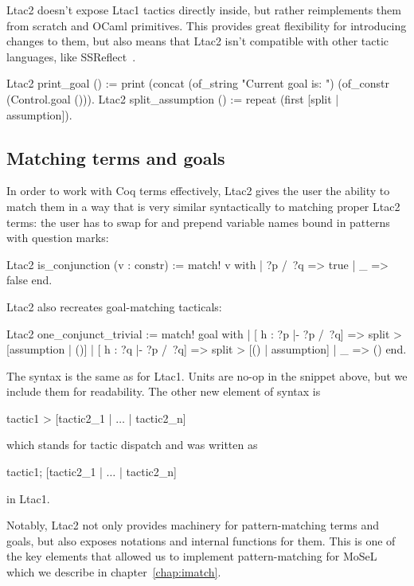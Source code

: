Ltac2 doesn't expose Ltac1 tactics directly inside, but rather reimplements them from scratch and OCaml primitives.
This provides great flexibility for introducing changes to them, but also means that Ltac2 isn't compatible with other tactic languages, like SSReflect~\cite[Section~3.1.3]{thecoqdevelopmentteamCoqProofAssistant2020}.

\begin{coq}
Ltac2 print_goal () := print (concat (of_string "Current goal is: ")
                                     (of_constr (Control.goal ())).
Ltac2 split_assumption () := repeat (first [split | assumption]).
\end{coq}

\subsection{Matching terms and goals}
\label{sec:matching-terms}

In order to work with Coq terms effectively, Ltac2 gives the user the ability to match them in a way that is very similar syntactically to matching proper Ltac2 terms: the user has to swap  for  and prepend variable names bound in patterns with question marks:
\begin{coq}
Ltac2 is_conjunction (v : constr) := match! v with
  | ?p /\ ?q => true
  | _ => false
  end.
\end{coq}

Ltac2 also recreates goal-matching tacticals:
\begin{coq}
Ltac2 one_conjunct_trivial :=
  match! goal with
  | [ h : ?p |- ?p /\ ?q] => split > [assumption | ()]
  | [ h : ?q |- ?p /\ ?q] => split > [() | assumption]
  | _ => ()
  end.
\end{coq}

The syntax is the same as for Ltac1.
Units \coqe{()} are no-op in the snippet above, but we include them for readability.
The other new element of syntax is
\begin{coq}
tactic1 > [tactic2_1 | $\ldots$ | tactic2_n]
\end{coq}
which stands for tactic dispatch and was written as
\begin{coq}
tactic1; [tactic2_1 |  $\ldots$ | tactic2_n]
\end{coq}
in Ltac1.

Notably, Ltac2 not only provides machinery for pattern-matching terms and goals, but also exposes notations and internal functions for them.
This is one of the key elements that allowed us to implement pattern-matching for MoSeL which we describe in chapter~\ref{chap:imatch}.

